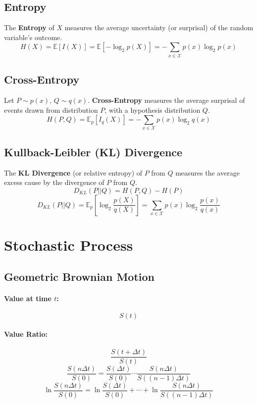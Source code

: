 \documentclass{article}
\begin{document}
\subsection{Entropy}
The \textbf{Entropy} of $X$ measures the average uncertainty (or surprisal) of the random variable's outcome.
\[
    H(X) = \mathbb{E}[I(X)] = \mathbb{E}[-\log_2 p(X)] = -\sum_{x \in \mathcal{X}} p(x) \log_2 p(x)
\]

\subsection{Cross-Entropy}
Let $P \sim p(x)$, $Q \sim q(x)$.
\newline
\textbf{Cross-Entropy} measures the average surprisal of events drawn from distribution $P$, with a hypothesis distribution $Q$.
\[
    H(P, Q) = \mathbb{E}_p[I_q(X)] = -\sum_{x \in \mathcal{X}} p(x) \log_2 q(x)
\]

\subsection{Kullback-Leibler (KL) Divergence}
The \textbf{KL Divergence} (or relative entropy) of $P$ from $Q$ measures the average excess cause by the divergence of $P$ from $Q$.
\[
    D_{KL}(P||Q) = H(P, Q) - H(P)
\]
\[
    D_{KL}(P||Q) = \mathbb{E}_p\left[\log_2 \frac{p(X)}{q(X)}\right] = \sum_{x \in \mathcal{X}} p(x) \log_2 \frac{p(x)}{q(x)}
\]

\newpage
\section{Stochastic Process}

\subsection{Geometric Brownian Motion}

\paragraph{Value at time $t$:}
\[
    S(t)
\]
\paragraph{Value Ratio:}
\[
    \frac{S(t+\Delta t)}{S(t)}
\]
\[
    \frac{S(n\Delta t)}{S(0)} = \frac{S(\Delta t)}{S(0)} \cdots \frac{S(n\Delta t)}{S((n-1)\Delta t)}
\]
\[
    \ln \frac{S(n\Delta t)}{S(0)} = \ln \frac{S(\Delta t)}{S(0)} + \cdots + \ln \frac{S(n\Delta t)}{S((n-1)\Delta t)}
\]
\end{document}
